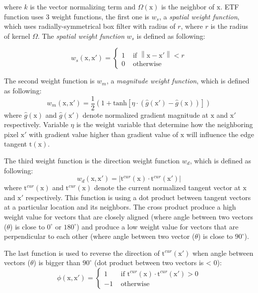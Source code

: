 where $ k $ is the vector normalizing term and $\Omega(\mbox{x})$ is the neighbor of $\mbox{x}$. ETF function uses 3 weight functions, the first one is $w_s$, a \textit{spatial weight function}, which uses radially-symmetrical box filter with radius of $r$, where $r$ is the radius of kernel $\Omega$. The \textit{spatial weight  function} $w_s$ is defined as following:

\newcommand{\norm}[1]{\left\| #1 \right\|}
\begin{equation}
	w_s(\mbox{x}, \mbox{x}') = 
	\left\{
		\begin{array}{ll}
			1&\mbox{ if }\norm{\mbox{x} - \mbox{x}'} < r
			\\0&\mbox{ otherwise }
		\end{array}
	\right.
\end{equation}

The second weight function is $w_m$, a \textit{magnitude weight function}, which is defined as following:
\begin{equation}
	w_m(\mbox{x}, \mbox{x}') = \frac{1}{2} (1 + \textrm{tanh}[\eta \cdot (\hat{g}(\mbox{x}') - \hat{g}(\mbox{x}) )])
\end{equation}
where $\hat{g}(\mbox{x})$ and $\hat{g}(\mbox{x}')$ denote normalized gradient magnitude at $\mbox{x}$ and $\mbox{x}'$ respectively. Variable $\eta$ is the weight variable that determine how the neighboring pixel $\mbox{x}'$ with gradient value higher than gradient value of $\mbox{x}$ will influence the edge tangent $\mbox{t}(\mbox{x})$. 

The third weight function is the direction weight function $w_d$, which is defined as following:
\begin{equation}
	w_d(\mbox{x}, \mbox{x}') = |\mbox{t}^{cur}(\mbox{x})\cdot \mbox{t}^{cur}(\mbox{x}')|
\end{equation}
where $\mbox{t}^{cur}(\mbox{x})$ and $\mbox{t}^{cur}(\mbox{x})$ denote the current normalized tangent vector at $\mbox{x}$ and $\mbox{x}'$ respectively. This function is using a dot product between tangent vectors at a particular location and its neighbors. The cross product produce a high weight value for vectors that are closely aligned (where angle between two vectors ($\theta$) is close to $0^{\circ}$ or $180^{\circ}$) and produce a low weight value for vectors that are perpendicular to each other (where angle between two vector ($\theta$) is close to $90^{\circ}$).

The last function is used to reverse the direction of $\mbox{t}^{cur}(\mbox{x}')$ when angle between vectors ($\theta$) is bigger than $90^{\circ}$ (dot product between two vectors is < 0):
\begin{equation}
	\phi(\mbox{x}, \mbox{x}') = 
	\left\{
		\begin{array}{ll}
			1&\mbox{ if }\mbox{t}^{cur}(\mbox{x})\cdot \mbox{t}^{cur}(\mbox{x}') > 0
			\\-1&\mbox{ otherwise }
		\end{array}
	\right.
\end{equation}

